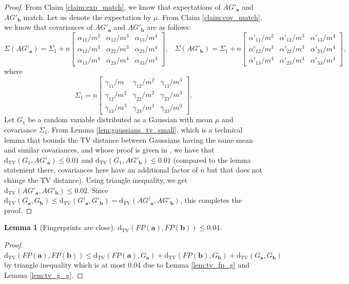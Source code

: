 \documentclass[10pt]{article} %
\theoremstyle{plain}
\newtheorem{lemma}[theorem]{Lemma}
\newcommand{\dtv}{\mathrm{d_{TV}}}
\newcommand{\ba}{\textbf{a}}
\newcommand{\bb}{\textbf{b}}
\begin{document}
\begin{proof}
	From Claim \ref{claim:exp_match}, we know that expectations of $AG'_\ba$ and $AG'_\bb$ match. Let us denote the expectation by $\mu$. From Claim \ref{claim:cov_match}, we know that covariances of $AG'_\ba$ and $AG'_\bb$ are as follows:
	$$
	\Sigma(AG'_\ba) = \Sigma_1 + n
	\begin{bmatrix}
		\alpha_{11}/m^2 & \alpha_{12}/m^3 & \alpha_{13}/m^4\\
		\alpha_{12}/m^3 & \alpha_{22}/m^3 & \alpha_{23}/m^4 \\
		\alpha_{13}/m^4 & \alpha_{23}/m^4 & \alpha_{33}/m^4
	\end{bmatrix}, ~~~~
	\Sigma(AG'_\bb) = \Sigma_1 + n
	\begin{bmatrix}
		\alpha'_{11}/m^2 & \alpha'_{12}/m^3 & \alpha'_{13}/m^4\\
		\alpha'_{12}/m^3 & \alpha'_{22}/m^3 & \alpha'_{23}/m^4 \\
		\alpha'_{13}/m^4 & \alpha'_{23}/m^4 & \alpha'_{33}/m^4
	\end{bmatrix},
	$$
	where
	$$
	\Sigma_1 = n
	\begin{bmatrix}
		\gamma_{11}/m & \gamma_{12}/m^2 & \gamma_{13}/m^3\\
		\gamma_{12}/m^2 & \gamma_{22}/m^2 & \gamma_{23}/m^3 \\
		\gamma_{13}/m^3 & \gamma_{23}/m^3 & \gamma_{33}/m^3
	\end{bmatrix}.
	$$
	Let $G_1$ be a random variable distributed as a Gaussian with mean $\mu$ and covariance $\Sigma_1$.
	From Lemma \ref{lem:gaussians_tv_small}, which is a technical lemma that bounds the TV distance between Gaussians having the same mean and similar covariances, and whose proof is given in , we have that $\dtv(G_1, AG'_\ba) \leq 0.01$ and $\dtv(G_1, AG'_\bb) \leq 0.01$ (compared to the lemma statement there, covariances here have an additional factor of $n$ but that does not change the TV distance). Using triangle inequality, we get $\dtv(AG'_\ba, AG'_\bb) \leq 0.02$. Since $\dtv(G_\ba, G_\bb) \leq \dtv(G'_\ba, G'_\bb) = \dtv(AG'_\ba, AG'_\bb)$, this completes the proof.
\end{proof}


\begin{lemma}[Fingerprints are close]
	\label{lem:fp_indisting}
	$\dtv(FP(\ba), FP(\bb)) \leq 0.04$.
\end{lemma}
\begin{proof}
	$\dtv(FP(\ba), FP(\bb)) \leq \dtv(FP(\ba), G_\ba) + \dtv(FP(\bb), G_\bb) + \dtv(G_\ba, G_\bb)$ by triangle inequality which is at most $0.04$ due to Lemma \ref{lem:tv_fp_g} and Lemma \ref{lem:tv_g_g}.
\end{proof}
\end{document}
